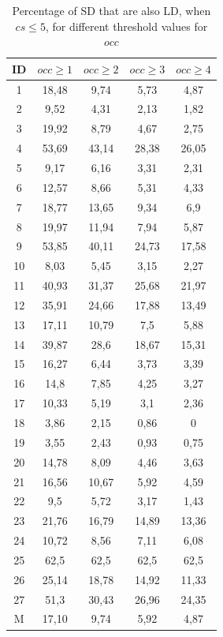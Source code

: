 \documentclass[a4paper,twoside]{article}
\begin{document}
\begin{table}[!h]
\renewcommand{\arraystretch}{1.25}
\caption{Percentage of SD that are also LD,  when $cs \leq 5$, for different threshold values for $occ$}
\label{table:10}
\centering
\begin{tabular}{|c|c|c|c|c|}
\hline
    ID  & $occ\geq 1$ & $occ\geq 2$ & $occ\geq 3$ & $occ\geq 4$  \\
\hline
1	&	18,48	&	9,74	&	5,73	&	4,87	\\
2	&	9,52	&	4,31	&	2,13	&	1,82	\\
3	&	19,92	&	8,79	&	4,67	&	2,75	\\
4	&	53,69	&	43,14	&	28,38	&	26,05	\\
5	&	9,17	&	6,16	&	3,31	&	2,31	\\
6	&	12,57	&	8,66	&	5,31	&	4,33	\\
7	&	18,77	&	13,65	&	9,34	&	6,9	\\
8	&	19,97	&	11,94	&	7,94	&	5,87	\\
9	&	53,85	&	40,11	&	24,73	&	17,58	\\
10	&	8,03	&	5,45	&	3,15	&	2,27	\\
11	&	40,93	&	31,37	&	25,68	&	21,97	\\
12	&	35,91	&	24,66	&	17,88	&	13,49	\\
13	&	17,11	&	10,79	&	7,5	&	5,88	\\
14	&	39,87	&	28,6	&	18,67	&	15,31	\\
15	&	16,27	&	6,44	&	3,73	&	3,39	\\
16	&	14,8	&	7,85	&	4,25	&	3,27	\\
17	&	10,33	&	5,19	&	3,1	&	2,36	\\
18	&	3,86	&	2,15	&	0,86	&	0	\\
19	&	3,55	&	2,43	&	0,93	&	0,75	\\
20	&	14,78	&	8,09	&	4,46	&	3,63	\\
21	&	16,56	&	10,67	&	5,92	&	4,59	\\
22	&	9,5	&	5,72	&	3,17	&	1,43	\\
23	&	21,76	&	16,79	&	14,89	&	13,36	\\
24	&	10,72	&	8,56	&	7,11	&	6,08	\\
25	&	62,5	&	62,5	&	62,5	&	62,5	\\
26	&	25,14	&	18,78	&	14,92	&	11,33	\\
27	&	51,3	&	30,43	&	26,96	&	24,35	\\
\hline
M	&	17,10&	9,74	&	5,92	&	4,87	\\

\hline
\end{tabular}
\end{table}
\end{document}
